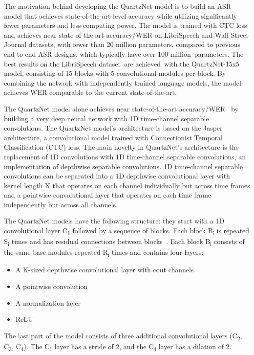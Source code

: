 \documentclass[conference]{IEEEtran}
\begin{document}
The motivation behind developing the QuartzNet model is to build an ASR model that achieves state-of-the-art-level accuracy while utilizing significantly fewer parameters and less computing power. The model is trained with CTC loss and achieves near state-of-the-art accuracy/WER on LibriSpeech and Wall Street Journal datasets, with fewer than 20 million parameters, compared to previous end-to-end ASR designs, which typically have over 100 million parameters. The best results on the LibriSpeech dataset are achieved with the QuartzNet-15x5 model, consisting of 15 blocks with 5 convolutional modules per block. By combining the network with independently trained language models, the model achieves WER comparable to the current state-of-the-art. 

The QuartzNet model alone achieves near state-of-the-art accuracy/WER  by building a very deep neural network with 1D time-channel separable convolutions. The QuartzNet model's architecture is based on the Jasper architecture, a convolutional model trained with Connectionist Temporal Classification (CTC) loss. The main novelty in QuartzNet's architecture is the replacement of 1D convolutions with 1D time-channel separable convolutions, an implementation of depthwise separable convolutions. 1D time-channel separable convolutions can be separated into a 1D depthwise convolutional layer with kernel length K that operates on each channel individually but across time frames and a pointwise convolutional layer that operates on each time frame independently but across all channels.

The QuartzNet models have the following structure: they start with a 1D convolutional layer C\textsubscript{1} followed by a sequence of blocks. Each block B\textsubscript{i} is repeated S\textsubscript{i} times and has residual connections between blocks . Each block B\textsubscript{i} consists of the same base modules repeated R\textsubscript{i} times and contains four layers:
\begin{itemize}

\item A K-sized depthwise convolutional layer with cout channels
\item A pointwise convolution
\item A normalization layer
\item ReLU

\end{itemize}

The last part of the model consists of three additional convolutional layers (C\textsubscript{2}, C\textsubscript{3}, C\textsubscript{4}). The C\textsubscript{1} layer has a stride of 2, and the C\textsubscript{4} layer has a dilation of 2. 
\end{document}
